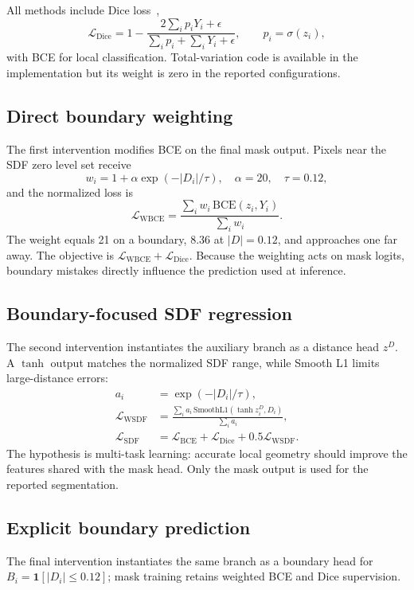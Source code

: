 \documentclass[10pt,twocolumn,letterpaper]{article}
\begin{document}
All methods include Dice loss~\cite{milletari2016vnet},
\begin{equation}
  \mathcal{L}_{\mathrm{Dice}}=1-\frac{2\sum_i p_iY_i+\epsilon}{\sum_i p_i+\sum_iY_i+\epsilon},
  \qquad p_i=\sigma(z_i),
\end{equation}
with BCE for local classification. Total-variation code is available in the implementation but its weight is zero in the reported configurations.

\subsection{Direct boundary weighting}
The first intervention modifies BCE on the final mask output. Pixels near the SDF zero level set receive
\begin{equation}
  w_i=1+\alpha\exp\left(-|D_i|/\tau\right),
  \quad \alpha=20,\quad \tau=0.12,
\end{equation}
and the normalized loss is
\begin{equation}
  \mathcal{L}_{\mathrm{WBCE}}=
  \frac{\sum_i w_i\,\mathrm{BCE}(z_i,Y_i)}{\sum_i w_i}.
\end{equation}
The weight equals 21 on a boundary, 8.36 at $|D|=0.12$, and approaches one far away. The objective is $\mathcal{L}_{\mathrm{WBCE}}+\mathcal{L}_{\mathrm{Dice}}$. Because the weighting acts on mask logits, boundary mistakes directly influence the prediction used at inference.

\subsection{Boundary-focused SDF regression}
The second intervention instantiates the auxiliary branch as a distance head $z^D$. A $\tanh$ output matches the normalized SDF range, while Smooth L1 limits large-distance errors:
\begin{align}
  a_i &= \exp\left(-|D_i|/\tau\right),\\
  \mathcal{L}_{\mathrm{WSDF}} &=
  \frac{\sum_i a_i\,\mathrm{SmoothL1}(\tanh z_i^D,D_i)}{\sum_i a_i},\\
  \mathcal{L}_{\mathrm{SDF}} &= \mathcal{L}_{\mathrm{BCE}}+
  \mathcal{L}_{\mathrm{Dice}}+0.5\mathcal{L}_{\mathrm{WSDF}}.
\end{align}
The hypothesis is multi-task learning: accurate local geometry should improve the features shared with the mask head. Only the mask output is used for the reported segmentation.

\subsection{Explicit boundary prediction}
The final intervention instantiates the same branch as a boundary head for $B_i=\mathbf{1}[|D_i|\leq0.12]$; mask training retains weighted BCE and Dice supervision.
\end{document}
